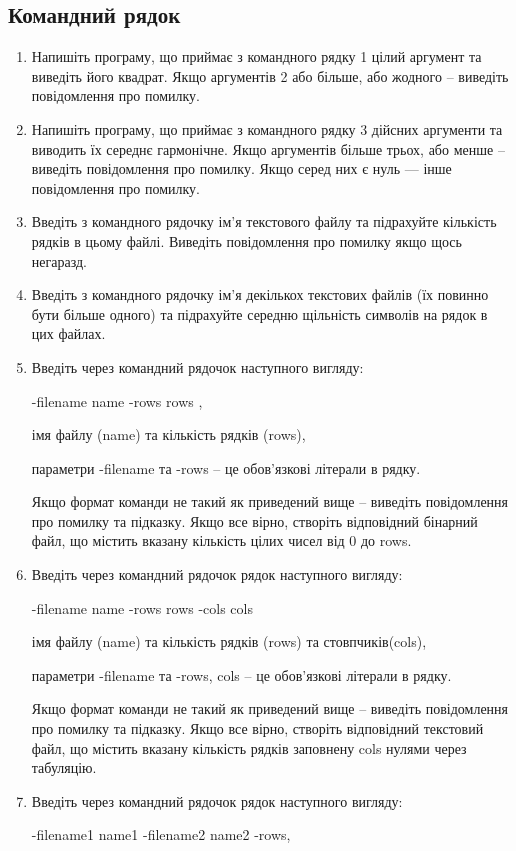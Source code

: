 \documentclass[]{article}
\begin{document}
\subsection{Командний рядок}
\begin{enumerate}
\item
Напишіть програму, що приймає з командного рядку 1 цілий аргумент та
виведіть його квадрат. Якщо аргументів 2 або більше, або жодного --
виведіть повідомлення про помилку.
\item
Напишіть програму, що приймає з командного рядку 3 дійсних аргументи та
виводить їх середнє гармонічне. Якщо аргументів більше трьох, або менше
-- виведіть повідомлення про помилку. Якщо серед них є нуль --- інше
повідомлення про помилку.
\item
Введіть з командного рядочку ім'я текстового файлу та підрахуйте
кількість рядків в цьому файлі. Виведіть повідомлення про помилку якщо
щось негаразд.
\item
Введіть з командного рядочку ім'я декількох текстових файлів (їх повинно
бути більше одного) та підрахуйте середню щільність символів на рядок в
цих файлах.
\item
Введіть через командний рядочок наступного вигляду:

-filename name -rows rows ,

імя файлу (name) та кількість рядків (rows),

параметри -filename та -rows -- це обов'язкові літерали в рядку.

Якщо формат команди не такий як приведений вище -- виведіть повідомлення
про помилку та підказку. Якщо все вірно, створіть відповідний бінарний
файл, що містить вказану кількість цілих чисел від 0 до rows.
\item
Введіть через командний рядочок рядок наступного вигляду:

-filename name -rows rows -cols cols

імя файлу (name) та кількість рядків (rows) та стовпчиків(cols),

параметри -filename та -rows, cols -- це обов'язкові літерали в рядку.

Якщо формат команди не такий як приведений вище -- виведіть повідомлення
про помилку та підказку. Якщо все вірно, створіть відповідний текстовий
файл, що містить вказану кількість рядків заповнену cols нулями через
табуляцію.
\item
Введіть через командний рядочок рядок наступного вигляду:

-filename1 name1 -filename2 name2 -rows,


\end{enumerate}
\end{document}
